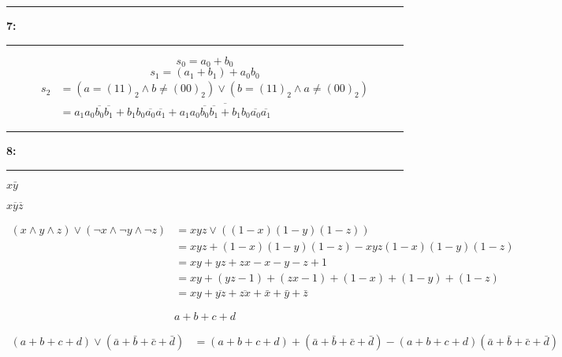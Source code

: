 \documentclass[11pt]{article}
\newcommand\question[2]{\vspace{.25in}\hrule\textbf{#1: #2}\vspace{.5em}\hrule\vspace{.10in}}
\begin{document}
\question{7}{}
\[s_0 = a_0 + b_0\]
\[s_1 = (a_1 + b_{1}) + a_0b_0\]
\begin{align*}
    s_2 &= (a = (11)_2 \land b \neq (00)_2)\lor (b = (11)_2 \land a \neq (00)_2) \\
        &= a_1a_0\overline{b_0}\overline{b_1} + b_1b_0\overline{a_0}\overline{a_1} + \overline{a_1a_0\overline{b_0}\overline{b_1} + b_1b_0\overline{a_0}\overline{a_1}}
\end{align*}


\question{8}{}
$x\bar{y}$

$x\overline{y}\overline{z}$

\begin{align*}
    (x \land y\land z) \lor (\lnot x \land \lnot y \land \lnot z) &= xyz \lor ((1-x)(1-y)(1-z))\\
    &= xyz + (1-x)(1-y)(1-z) - xyz(1-x)(1-y)(1-z) \\
    &= xy+yz+zx -x -y -z + 1\\
    &= xy + (yz-1) + (zx-1) + (1-x) + (1-y) + (1 - z) \\ 
    &= xy + \overline{yz} + \overline{zx} + \bar{x} + \bar{y} + \bar{z}
\end{align*}

\[a + b + c + d\]

\begin{align*}
(a + b + c + d) \lor (\bar{a} + \bar{b} +\bar{c} +\bar{d}) &= (a + b + c + d) + (\bar{a} + \bar{b} +\bar{c} +\bar{d}) - (a + b + c + d)(\bar{a} + \bar{b} +\bar{c} +\bar{d})\\
\end{align*}
\end{document}
